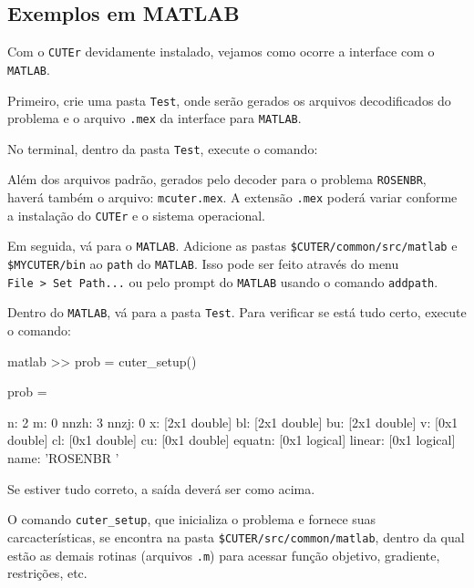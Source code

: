 \subsection{Exemplos em MATLAB}
Com o {\tt CUTEr} devidamente instalado, vejamos como ocorre a interface com o {\tt MATLAB}.

Primeiro, crie uma pasta {\tt Test}, onde ser\~ao gerados os arquivos decodificados do problema
 e o arquivo {\tt .mex} da interface para {\tt MATLAB}.

No terminal, dentro da pasta {\tt Test}, execute o comando:
Al\'em dos arquivos padr\~ao, gerados pelo decoder para o problema {\tt ROSENBR}, haver\'a 
tamb\'em o arquivo: {\tt mcuter.mex}. A extens\~ao {\tt .mex} poder\'a variar conforme a 
instala\c{c}\~ao do {\tt CUTEr} e o sistema operacional.

Em seguida, v\'a para o {\tt MATLAB}. Adicione as pastas {\tt \$CUTER/common/src/matlab} e {\tt 
\$MYCUTER/bin} ao {\tt path} do {\tt MATLAB}. Isso pode ser feito atrav\'es do menu {\tt File\ 
>\ Set Path...} ou pelo prompt do {\tt MATLAB} usando o comando {\tt addpath}.

Dentro do {\tt MATLAB}, v\'a para a pasta {\tt Test}. Para verificar se est\'a tudo certo, 
execute o comando:
\begin{code}{matlab}
>> prob = cuter_setup()

prob = 

         n: 2
         m: 0
      nnzh: 3
      nnzj: 0
         x: [2x1 double]
        bl: [2x1 double]
        bu: [2x1 double]
         v: [0x1 double]
        cl: [0x1 double]
        cu: [0x1 double]
    equatn: [0x1 logical]
    linear: [0x1 logical]
      name: 'ROSENBR   '
\end{code}
Se estiver tudo correto, a sa\'ida dever\'a ser como acima.

O comando {\tt cuter\_setup}, que inicializa o problema e fornece suas carcacter\'isticas, se 
encontra na pasta {\tt \$CUTER/src/common/matlab}, dentro da qual est\~ao as demais rotinas 
(arquivos {\tt .m}) para acessar fun\c{c}\~ao objetivo, gradiente, restri\c{c}\~oes, etc.

